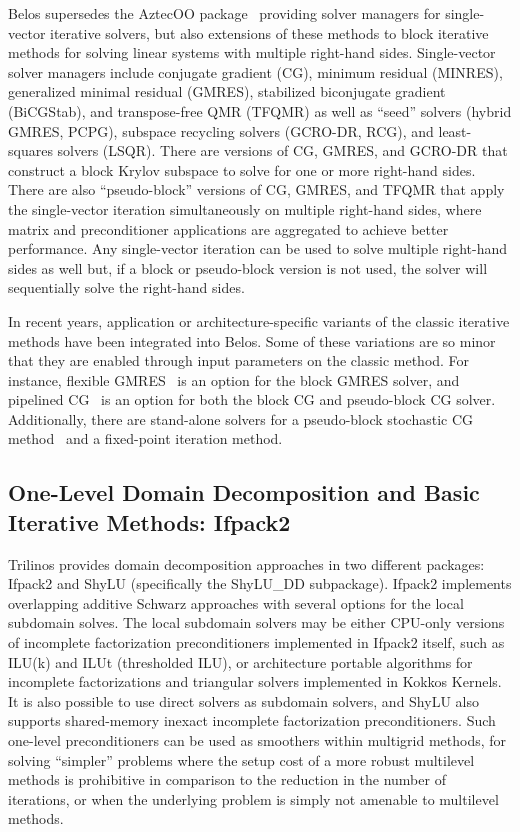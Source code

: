 Belos supersedes the AztecOO package~\cite{Heroux2004a} providing solver managers for single-vector iterative solvers, but also extensions of these methods to block iterative methods for solving linear systems with multiple right-hand sides.  Single-vector solver managers include conjugate gradient (CG), minimum residual (MINRES), generalized minimal residual (GMRES), stabilized biconjugate gradient (BiCGStab), and transpose-free QMR (TFQMR) as well as ``seed'' solvers (hybrid GMRES, PCPG), subspace recycling solvers (GCRO-DR, RCG), and least-squares solvers (LSQR).  There are versions of CG, GMRES, and GCRO-DR that construct a block Krylov subspace to solve for one or more right-hand sides.  There are also ``pseudo-block'' versions of CG, GMRES, and TFQMR that apply the single-vector iteration simultaneously on multiple right-hand sides, where matrix and preconditioner applications are aggregated to achieve better performance.  Any single-vector iteration can be used to solve multiple right-hand sides as well but, if a block or pseudo-block version is not used, the solver will sequentially solve the right-hand sides.

In recent years, application or architecture-specific variants of the classic iterative methods have been integrated into Belos. Some of these variations are so minor that they are enabled through input parameters on the classic method. For instance, flexible GMRES~\cite{Saad1993a} is an option for the block GMRES solver, and pipelined CG~\cite{GHYSELS2014224} is an option for both the block CG and pseudo-block CG solver.  Additionally, there are stand-alone solvers for a pseudo-block stochastic CG method~\cite{Parker2012SamplingGD} and a fixed-point iteration method.


\subsection{One-Level Domain Decomposition and Basic Iterative Methods: Ifpack2}

Trilinos provides domain decomposition approaches in two different
packages: Ifpack2 and ShyLU (specifically the ShyLU\_DD
subpackage). Ifpack2 implements overlapping additive Schwarz
approaches with several options for the local subdomain solves. The
local subdomain solvers may be either CPU-only versions of incomplete
factorization preconditioners implemented in Ifpack2 itself, such as
ILU(k) and ILUt (thresholded ILU), or architecture portable algorithms
for incomplete factorizations and triangular solvers implemented in
Kokkos Kernels. It is also possible to use direct solvers as subdomain
solvers, and ShyLU also supports shared-memory inexact
incomplete factorization preconditioners.
%
Such one-level preconditioners can be used as smoothers within multigrid
methods,
for solving ``simpler'' problems where the setup cost of a
more robust multilevel methods is prohibitive in comparison to the
reduction in the number of iterations, or when the underlying problem
is simply not amenable to multilevel methods.

